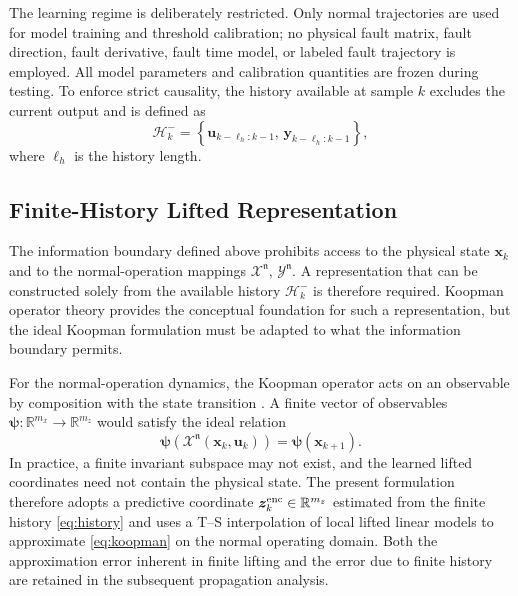 \documentclass[journal]{IEEEtran}
\newcommand{\1}{\bm 1}
\begin{document}
The learning regime is deliberately restricted. Only normal trajectories are
used for model training and threshold calibration; no physical fault matrix,
fault direction, fault derivative, fault time model, or labeled fault
trajectory is employed. All model parameters and calibration quantities are
frozen during testing. To enforce strict causality, the history available at
sample $k$ excludes the current output and is defined as
\begin{equation}
\mathcal H_k^-=
\left\{\bm u_{k-\ell_h:k-1},\,
\bm y_{k-\ell_h:k-1}\right\},
\label{eq:history}
\end{equation}
where $\ell_h$ is the history length.

\subsection{Finite-History Lifted Representation}
The information boundary defined above prohibits access to the physical state
$\bm x_k$ and to the normal-operation mappings $\mathcal X^{\mathfrak n}$,
$\mathcal Y^{\mathfrak n}$. A representation that can be constructed solely
from the available history $\mathcal H_k^-$ is therefore required. Koopman
operator theory provides the conceptual foundation for such a representation,
but the ideal Koopman formulation must be adapted to what the information
boundary permits.

For the normal-operation dynamics, the Koopman operator acts on an observable
by composition with the state transition \cite{brunton2016}. A finite vector
of observables $\bm\psi:\mathbb R^{m_x}\rightarrow\mathbb R^{m_z}$ would
satisfy the ideal relation
\begin{equation}
\bm\psi\!\left(\mathcal X^{\mathfrak n}(\bm x_k,\bm u_k)\right)
=\bm\psi(\bm x_{k+1}).
\label{eq:koopman}
\end{equation}
In practice, a finite invariant subspace may not exist, and the learned lifted
coordinates need not contain the physical state. The present formulation
therefore adopts a predictive coordinate $\bm z_k^{\rm enc}\in\mathbb
R^{m_z}$ estimated from the finite history \eqref{eq:history} and uses a T--S
interpolation of local lifted linear models to approximate \eqref{eq:koopman}
on the normal operating domain. Both the approximation error inherent in
finite lifting and the error due to finite history are retained in the
subsequent propagation analysis.
\end{document}
